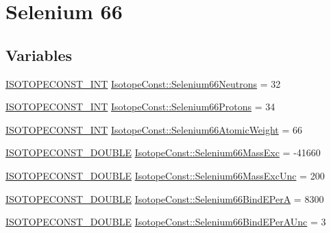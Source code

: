 \hypertarget{group___isotope_const-_selenium-_se66}{}\section{Selenium 66}
\label{group___isotope_const-_selenium-_se66}
\subsection*{Variables}
\begin{DoxyCompactItemize}
\item 
\mbox{\hyperlink{group___isotope_const-_macros_ga5f18360b3e99483a35c32d789e62621c}{I\+S\+O\+T\+O\+P\+E\+C\+O\+N\+S\+T\+\_\+\+I\+NT}} \mbox{\hyperlink{group___isotope_const-_selenium-_se66_ga77eb73ffd5965dbe43cab1c32d5c17db}{Isotope\+Const\+::\+Selenium66\+Neutrons}} = 32
\item 
\mbox{\hyperlink{group___isotope_const-_macros_ga5f18360b3e99483a35c32d789e62621c}{I\+S\+O\+T\+O\+P\+E\+C\+O\+N\+S\+T\+\_\+\+I\+NT}} \mbox{\hyperlink{group___isotope_const-_selenium-_se66_gaaad89e12afaf7886d24448b39bb290cf}{Isotope\+Const\+::\+Selenium66\+Protons}} = 34
\item 
\mbox{\hyperlink{group___isotope_const-_macros_ga5f18360b3e99483a35c32d789e62621c}{I\+S\+O\+T\+O\+P\+E\+C\+O\+N\+S\+T\+\_\+\+I\+NT}} \mbox{\hyperlink{group___isotope_const-_selenium-_se66_ga4b218fe4791c9cad7dc0a50d2d47bfbd}{Isotope\+Const\+::\+Selenium66\+Atomic\+Weight}} = 66
\item 
\mbox{\hyperlink{group___isotope_const-_macros_ga8f45a7272ce02c0b4c65c44636ed719a}{I\+S\+O\+T\+O\+P\+E\+C\+O\+N\+S\+T\+\_\+\+D\+O\+U\+B\+LE}} \mbox{\hyperlink{group___isotope_const-_selenium-_se66_gabaad80968379533bab4efecef1a52154}{Isotope\+Const\+::\+Selenium66\+Mass\+Exc}} = -\/41660
\item 
\mbox{\hyperlink{group___isotope_const-_macros_ga8f45a7272ce02c0b4c65c44636ed719a}{I\+S\+O\+T\+O\+P\+E\+C\+O\+N\+S\+T\+\_\+\+D\+O\+U\+B\+LE}} \mbox{\hyperlink{group___isotope_const-_selenium-_se66_ga2939d5ff25e4252bf3fda1d2d1873973}{Isotope\+Const\+::\+Selenium66\+Mass\+Exc\+Unc}} = 200
\item 
\mbox{\hyperlink{group___isotope_const-_macros_ga8f45a7272ce02c0b4c65c44636ed719a}{I\+S\+O\+T\+O\+P\+E\+C\+O\+N\+S\+T\+\_\+\+D\+O\+U\+B\+LE}} \mbox{\hyperlink{group___isotope_const-_selenium-_se66_ga2388b8a39b6d0b61870cbd8048108d11}{Isotope\+Const\+::\+Selenium66\+Bind\+E\+PerA}} = 8300
\item 
\mbox{\hyperlink{group___isotope_const-_macros_ga8f45a7272ce02c0b4c65c44636ed719a}{I\+S\+O\+T\+O\+P\+E\+C\+O\+N\+S\+T\+\_\+\+D\+O\+U\+B\+LE}} \mbox{\hyperlink{group___isotope_const-_selenium-_se66_ga6d2e2a70f2eb8f0daec253515fc3d532}{Isotope\+Const\+::\+Selenium66\+Bind\+E\+Per\+A\+Unc}} = 3

\end{DoxyCompactItemize}
